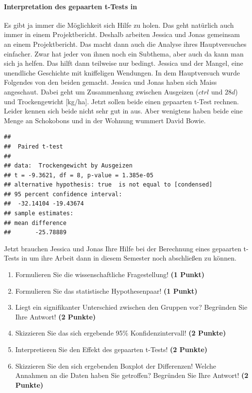 \documentclass[a4paper, 9pt]{scrartcl}\usepackage[]{graphicx}\usepackage[]{xcolor}
\makeatletter
\newenvironment{kframe}{%
 \def\at@end@of@kframe{}%
 \ifinner\ifhmode%
  \def\at@end@of@kframe{\end{minipage}}%
  \begin{minipage}{\columnwidth}%
 \fi\fi%
 \def\FrameCommand##1{\hskip\@totalleftmargin \hskip-\fboxsep
 \colorbox{shadecolor}{##1}\hskip-\fboxsep
     \hskip-\linewidth \hskip-\@totalleftmargin \hskip\columnwidth}%
 \MakeFramed {\advance\hsize-\width
   \@totalleftmargin\z@ \linewidth\hsize
   \@setminipage}}%
 {\par\unskip\endMakeFramed%
 \at@end@of@kframe}
\newenvironment{knitrout}{}{} %
\makeatother
\begin{document}
\paragraph{Interpretation des gepaarten t-Tests in \Rlogo}

Es gibt ja immer die Möglichkeit sich Hilfe zu holen. Das geht natürlich auch immer in einem Projektbericht. Deshalb arbeiten Jessica und Jonas gemeinsam an einem Projektbericht. Das macht dann auch die Analyse ihres Hauptversuches einfacher. Zwar hat jeder von ihnen noch ein Subthema, aber auch da kann man sich ja helfen. Das hilft dann teilweise nur bedingt. Jessica und der Mangel, eine unendliche Geschichte mit kniffeligen Wendungen. In dem Hauptversuch wurde Folgendes von den beiden gemacht. Jessica und Jonas haben sich Maiss angeschaut. Dabei geht um Zusammenhang zwischen Ausgeizen ($ctrl$ und $28d$) und Trockengewicht [kg/ha]. Jetzt sollen beide einen gepaarten t-Test rechnen. Leider kennen sich beide nicht sehr gut in \Rlogo aus. Aber wenigtens haben beide eine Menge an Schokobons und in der Wohnung wummert David Bowie.

\begin{knitrout}
\color{fgcolor}\begin{kframe}
\begin{verbatim}
## 
## 	Paired t-test
## 
## data:  Trockengewicht by Ausgeizen
## t = -9.3621, df = 8, p-value = 1.385e-05
## alternative hypothesis: true  is not equal to [condensed]
## 95 percent confidence interval:
##  -32.14104 -19.43674
## sample estimates:
## mean difference 
##       -25.78889
\end{verbatim}
\end{kframe}
\end{knitrout}

Jetzt brauchen Jessica und Jonas Ihre Hilfe bei der Berechnung eines gepaarten t-Tests in \Rlogo um ihre Arbeit dann in diesem Semester noch abschließen zu können.

\begin{enumerate}
  \item Formulieren Sie die wissenschaftliche Fragestellung! \textbf{(1 Punkt)}
  \item Formulieren Sie das statistische Hypothesenpaar! \textbf{(1 Punkt)}
\item Liegt ein signifikanter Unterschied zwischen den Gruppen vor?
  Begründen Sie Ihre Antwort! \textbf{(2 Punkte)}
\item Skizzieren Sie das sich ergebende 95\% Konfidenzintervall! \textbf{(2 Punkte)}
\item Interpretieren Sie den Effekt des gepaarten t-Tests! \textbf{(2 Punkte)}
\item Skizzieren Sie den sich ergebenden Boxplot der Differenzen! Welche Annahmen an die Daten haben Sie getroffen? Begründen Sie Ihre Antwort! \textbf{(2 Punkte)} 
\end{enumerate}
 
\end{document}
